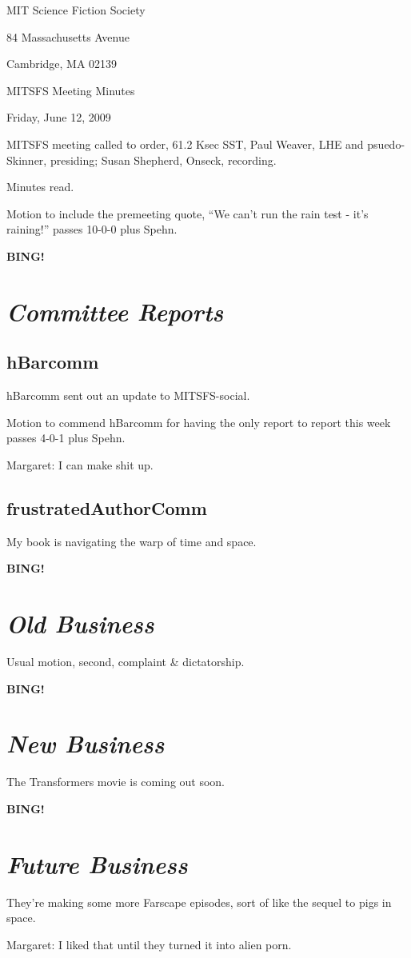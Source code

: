 \documentclass[10pt]{article}
\newcommand{\bing}{{\bf BING!} }
\newcommand{\goto}[1]{\bing \vskip 12pt \section*{{\em{#1}}}}
\newcommand{\ps}{ plus Spehn\xspace}
\begin{document}
\begin{center}

MIT Science Fiction Society

84 Massachusetts Avenue

Cambridge, MA 02139

\vspace{12pt}

MITSFS Meeting Minutes

Friday, June 12, 2009

\end{center}

\vspace{18pt}

\setlength{\parskip}{6pt}

\noindent
MITSFS meeting called to order, 61.2 Ksec SST,
Paul Weaver, LHE and psuedo-Skinner, presiding; Susan Shepherd, Onseck, recording.

Minutes read.

Motion to include the premeeting quote, ``We can't run the rain test - it's raining!'' passes 10-0-0\ps.

\goto{Committee Reports}

\subsection*{hBarcomm}

hBarcomm sent out an update to MITSFS-social.

Motion to commend hBarcomm for having the only report to report this week passes 4-0-1\ps.

Margaret: I can make shit up.

\subsection*{frustratedAuthorComm}

My book is navigating the warp of time and space.

\goto{Old Business}

Usual motion, second, complaint & dictatorship.

\goto{New Business}

The Transformers movie is coming out soon.

\goto{Future Business}

They're making some more Farscape episodes, sort of like the sequel to pigs in space.

Margaret: I liked that until they turned it into alien porn.
\end{document}
